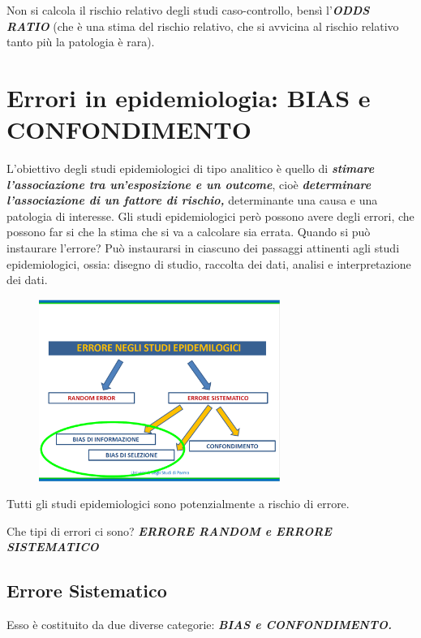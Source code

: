 Non si calcola il rischio relativo degli studi caso-controllo, bensì l'\textbf{\emph{ODDS RATIO}} (che è una stima del rischio relativo, che si avvicina al rischio relativo tanto più la patologia è rara).

\section{Errori in epidemiologia: BIAS e CONFONDIMENTO}

L'obiettivo degli studi epidemiologici di tipo analitico è quello di \textbf{\emph{stimare l'associazione tra un'esposizione e un outcome}}, cioè \textbf{\emph{determinare l'associazione di un fattore di rischio,}} determinante una causa e una patologia di interesse. Gli studi epidemiologici però possono avere degli errori, che possono far si che la stima che si va a calcolare sia errata. Quando si può instaurare l'errore? Può instaurarsi in ciascuno dei passaggi attinenti agli studi epidemiologici, ossia: disegno di studio, raccolta dei dati, analisi e interpretazione dei dati.

\begin{figure}[!ht]
\centering
\includegraphics[width=0.7\textwidth]{05/image6.png}
\end{figure}

Tutti gli studi epidemiologici sono potenzialmente a rischio di errore.

Che tipi di errori ci sono? \textbf{\emph{ERRORE RANDOM e ERRORE SISTEMATICO}}

\subsection{Errore Sistematico}

Esso è costituito da due diverse categorie: \textbf{\emph{BIAS e CONFONDIMENTO. }}

